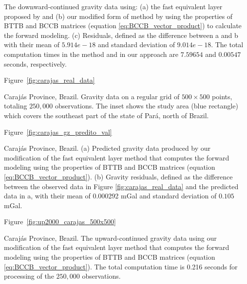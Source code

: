 \documentclass[manuscript,revised]{geophysics}
\begin{document}
{The downward-continued gravity data using: (a) the fast equivalent layer proposed by \citet{siqueira-etal2017} and (b) our modified form of \citet{siqueira-etal2017} method by using the properties of BTTB and BCCB matrices (equation \ref{eq:BCCB_vector_product}) to calculate the forward modeling.  (c) Residuals, defined as the difference between a and b with their mean of $5.914e-18$ and standard deviation of $9.014e-18$.  The total computation times in the \citet{siqueira-etal2017} method and in our approach are $7.59654$ and $0.00547$ seconds, respectively.}
\newpage

Figure~\ref{fig:carajas_real_data}

{Caraj\'as Province, Brazil. Gravity data on a regular grid of $500 \times 500$ points, totaling $250,000$ observations. The inset shows the study area (blue rectangle) which covers the southeast part of the state of Par\'a, north of Brazil.}
\newpage

Figure~\ref{fig:carajas_gz_predito_val}

{Caraj\'as Province, Brazil. (a) Predicted gravity data produced by our modification of the fast equivalent layer method \citep{siqueira-etal2017}  that computes the forward modeling using the properties of BTTB and BCCB matrices (equation \ref{eq:BCCB_vector_product}). (b) Gravity residuals, defined as the difference between the observed data in Figure \ref{fig:carajas_real_data} and the predicted data in a, with their mean of 0.000292 mGal and standard deviation of $0.105$ mGal.}
\newpage

Figure~\ref{fig:up2000_carajas_500x500}

{Caraj\'as Province, Brazil. The upward-continued gravity data using our modification of the fast equivalent layer method \citep{siqueira-etal2017} that computes the forward modeling using the properties of BTTB and BCCB matrices (equation \ref{eq:BCCB_vector_product}). The total computation time is 0.216 seconds for processing of the $250,000$ observations.}
\newpage

%
%
\end{document}
